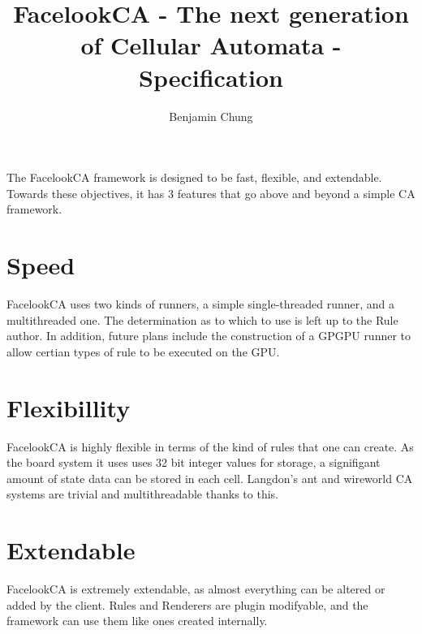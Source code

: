 \documentclass{report}
\title{FacelookCA - The next generation of Cellular Automata - Specification}
\author{Benjamin Chung}%
\begin{document}
\maketitle
The FacelookCA framework is designed to be fast, flexible, and extendable. 
Towards these objectives, it has 3 features that go above and beyond a simple CA
framework.
\section{Speed}
FacelookCA uses two kinds of runners, a simple single-threaded runner, and a
multithreaded one. The determination as to which to use is left up to the Rule
author. In addition, future plans include the construction of a GPGPU runner to
allow certian types of rule to be executed on the GPU.
\section{Flexibillity}
FacelookCA is highly flexible in terms of the kind of rules that one can create.
As the board system it uses uses 32 bit integer values for storage, a
signifigant amount of state data can be stored in each cell. Langdon's ant and
wireworld CA systems are trivial and multithreadable thanks to this.
\section{Extendable}
FacelookCA is extremely extendable, as almost everything can be altered or added
by the client. Rules and Renderers are plugin modifyable, and
the framework can use them like ones created internally.
\end{document}
